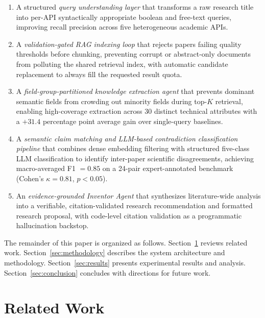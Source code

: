 \documentclass[conference]{IEEEtran}
\begin{document}
\begin{enumerate}
    \item A structured \textit{query understanding layer} that transforms a
    raw research title into per-API syntactically appropriate boolean and
    free-text queries, improving recall precision across five heterogeneous
    academic APIs.

    \item A \textit{validation-gated RAG indexing loop} that rejects papers
    failing quality thresholds before chunking, preventing corrupt or
    abstract-only documents from polluting the shared retrieval index, with
    automatic candidate replacement to always fill the requested result quota.

    \item A \textit{field-group-partitioned knowledge extraction agent} that
    prevents dominant semantic fields from crowding out minority fields during
    top-$K$ retrieval, enabling high-coverage extraction across 30 distinct
    technical attributes with a $+31.4$ percentage point average gain over
    single-query baselines.

    \item A \textit{semantic claim matching and LLM-based contradiction
    classification pipeline} that combines dense embedding filtering with
    structured five-class LLM classification to identify inter-paper
    scientific disagreements, achieving macro-averaged F1 $= 0.85$ on a
    24-pair expert-annotated benchmark (Cohen's $\kappa = 0.81$, $p < 0.05$).

    \item An \textit{evidence-grounded Inventor Agent} that synthesizes
    literature-wide analysis into a verifiable, citation-validated research
    recommendation and formatted research proposal, with code-level citation
    validation as a programmatic hallucination backstop.
\end{enumerate}

The remainder of this paper is organized as follows. Section~\ref{sec:related}
reviews related work. Section~\ref{sec:methodology} describes the system
architecture and methodology. Section~\ref{sec:results} presents experimental
results and analysis. Section~\ref{sec:conclusion} concludes with directions
for future work.

\section{Related Work}
\label{sec:related}
\end{document}
